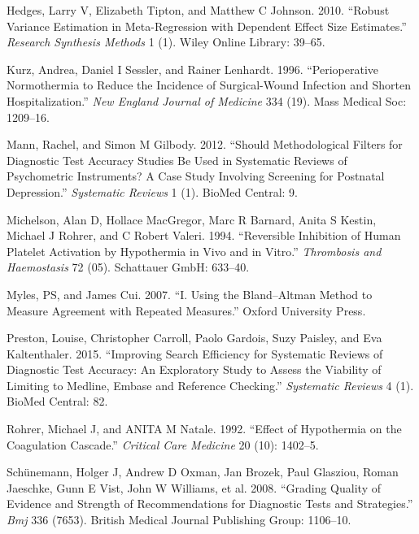 \documentclass[smallextended]{svjour3}       %
\begin{document}
\leavevmode\hypertarget{ref-hedges2010robust}{}%
Hedges, Larry V, Elizabeth Tipton, and Matthew C Johnson. 2010. ``Robust
Variance Estimation in Meta-Regression with Dependent Effect Size
Estimates.'' \emph{Research Synthesis Methods} 1 (1). Wiley Online
Library: 39--65.

\leavevmode\hypertarget{ref-kurz1996perioperative}{}%
Kurz, Andrea, Daniel I Sessler, and Rainer Lenhardt. 1996.
``Perioperative Normothermia to Reduce the Incidence of Surgical-Wound
Infection and Shorten Hospitalization.'' \emph{New England Journal of
Medicine} 334 (19). Mass Medical Soc: 1209--16.

\leavevmode\hypertarget{ref-mann2012should}{}%
Mann, Rachel, and Simon M Gilbody. 2012. ``Should Methodological Filters
for Diagnostic Test Accuracy Studies Be Used in Systematic Reviews of
Psychometric Instruments? A Case Study Involving Screening for Postnatal
Depression.'' \emph{Systematic Reviews} 1 (1). BioMed Central: 9.

\leavevmode\hypertarget{ref-michelson1994reversible}{}%
Michelson, Alan D, Hollace MacGregor, Marc R Barnard, Anita S Kestin,
Michael J Rohrer, and C Robert Valeri. 1994. ``Reversible Inhibition of
Human Platelet Activation by Hypothermia in Vivo and in Vitro.''
\emph{Thrombosis and Haemostasis} 72 (05). Schattauer GmbH: 633--40.

\leavevmode\hypertarget{ref-myles2007using}{}%
Myles, PS, and James Cui. 2007. ``I. Using the Bland--Altman Method to
Measure Agreement with Repeated Measures.'' Oxford University Press.

\leavevmode\hypertarget{ref-preston2015improving}{}%
Preston, Louise, Christopher Carroll, Paolo Gardois, Suzy Paisley, and
Eva Kaltenthaler. 2015. ``Improving Search Efficiency for Systematic
Reviews of Diagnostic Test Accuracy: An Exploratory Study to Assess the
Viability of Limiting to Medline, Embase and Reference Checking.''
\emph{Systematic Reviews} 4 (1). BioMed Central: 82.

\leavevmode\hypertarget{ref-rohrer1992effect}{}%
Rohrer, Michael J, and ANITA M Natale. 1992. ``Effect of Hypothermia on
the Coagulation Cascade.'' \emph{Critical Care Medicine} 20 (10):
1402--5.

\leavevmode\hypertarget{ref-schunemann2008grading}{}%
Schünemann, Holger J, Andrew D Oxman, Jan Brozek, Paul Glasziou, Roman
Jaeschke, Gunn E Vist, John W Williams, et al. 2008. ``Grading Quality
of Evidence and Strength of Recommendations for Diagnostic Tests and
Strategies.'' \emph{Bmj} 336 (7653). British Medical Journal Publishing
Group: 1106--10.
\end{document}
